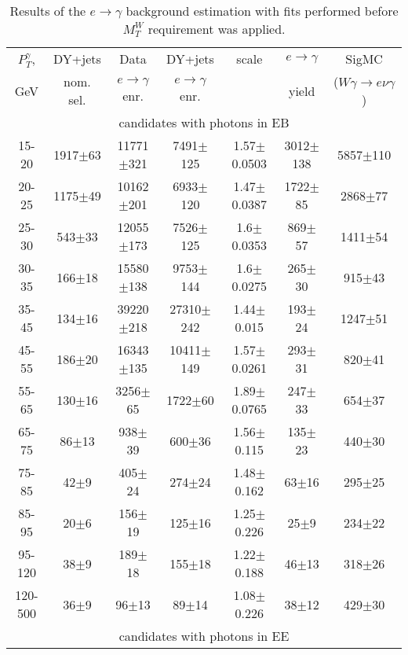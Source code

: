 \begin{table}[h]
  \scriptsize
  \begin{center}
  \caption{Results of the $e\rightarrow\gamma$ background estimation with fits performed before $M_T^W$ requirement was applied. } 
   \begin{tabular}{|c|c|c|c|c|c|c|}
 $P_T^{\gamma}$,  & DY+jets    & Data                      & DY+jets & scale & $e\rightarrow\gamma$ & SigMC\\ 
 GeV & nom. sel. & $e\rightarrow\gamma$ enr. & $e\rightarrow\gamma$ enr. & & yield & ($W\gamma\rightarrow e\nu\gamma$)\\ \hline
 \multicolumn{7}{|c|}{candidates with photons in EB}\\ 
15-20 & 1917$\pm$63 & 11771$\pm$321 & 7491$\pm$125 & 1.57$\pm$0.0503& 3012$\pm$138& 5857$\pm$110 \\ \hline
20-25 & 1175$\pm$49 & 10162$\pm$201 & 6933$\pm$120 & 1.47$\pm$0.0387& 1722$\pm$85& 2868$\pm$77 \\ \hline
25-30 & 543$\pm$33 & 12055$\pm$173 & 7526$\pm$125 & 1.6$\pm$0.0353& 869$\pm$57& 1411$\pm$54 \\ \hline
30-35 & 166$\pm$18 & 15580$\pm$138 & 9753$\pm$144 & 1.6$\pm$0.0275& 265$\pm$30& 915$\pm$43 \\ \hline
35-45 & 134$\pm$16 & 39220$\pm$218 & 27310$\pm$242 & 1.44$\pm$0.015& 193$\pm$24& 1247$\pm$51 \\ \hline
45-55 & 186$\pm$20 & 16343$\pm$135 & 10411$\pm$149 & 1.57$\pm$0.0261& 293$\pm$31& 820$\pm$41 \\ \hline
55-65 & 130$\pm$16 & 3256$\pm$65 & 1722$\pm$60 & 1.89$\pm$0.0765& 247$\pm$33& 654$\pm$37 \\ \hline
65-75 & 86$\pm$13 & 938$\pm$39 & 600$\pm$36 & 1.56$\pm$0.115& 135$\pm$23& 440$\pm$30 \\ \hline
75-85 & 42$\pm$9 & 405$\pm$24 & 274$\pm$24 & 1.48$\pm$0.162& 63$\pm$16& 295$\pm$25 \\ \hline
85-95 & 20$\pm$6 & 156$\pm$19 & 125$\pm$16 & 1.25$\pm$0.226& 25$\pm$9& 234$\pm$22 \\ \hline
95-120 & 38$\pm$9 & 189$\pm$18 & 155$\pm$18 & 1.22$\pm$0.188& 46$\pm$13& 318$\pm$26 \\ \hline
120-500 & 36$\pm$9 & 96$\pm$13 & 89$\pm$14 & 1.08$\pm$0.226& 38$\pm$12& 429$\pm$30 \\ \hline
\multicolumn{7}{|c|}{candidates with photons in EE}\\ 

\end{tabular}
\end{center}
\end{table}
